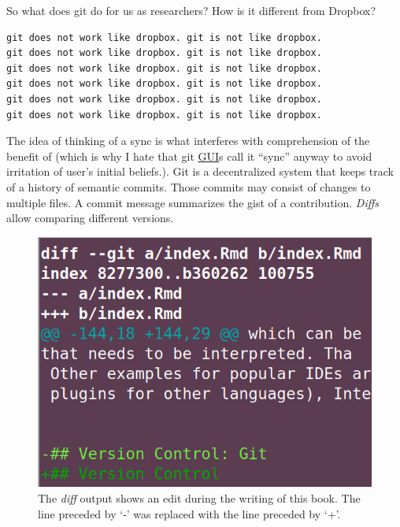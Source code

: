 \documentclass[
  12pt,
  letterpaper,
]{krantz}
\begin{document}
So what does git do for us as researchers? How is it different from
Dropbox?

\begin{verbatim}
git does not work like dropbox. git is not like dropbox.
git does not work like dropbox. git is not like dropbox. 
git does not work like dropbox. git is not like dropbox.
git does not work like dropbox. git is not like dropbox. 
git does not work like dropbox. git is not like dropbox.
git does not work like dropbox. git is not like dropbox. 
\end{verbatim}

The idea of thinking of a sync is what interferes with comprehension of
the benefit of  (which is why I hate that git
\protect\hyperlink{glossary}{GUI}s call it ``sync'' anyway to avoid
irritation of user's initial beliefs.). Git is a decentralized
 system that keeps track of a history of semantic
commits. Those commits may consist of changes to multiple files. A
commit message summarizes the gist of a contribution. \emph{Diffs} allow
comparing different versions.

\begin{figure}

{\centering \includegraphics{./images/diff.png}

}

\caption{The \emph{diff} output shows an edit during the writing of this
book. The line preceded by `-' was replaced with the line preceded by
`+'.}

\end{figure}
\end{document}
